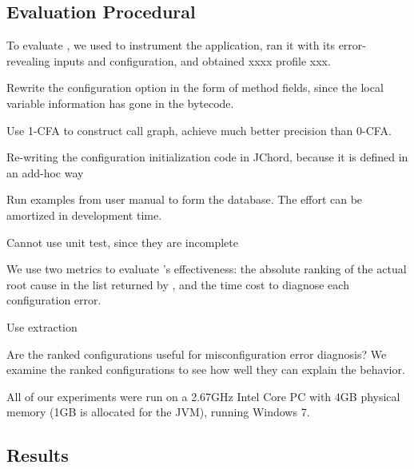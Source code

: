 \subsection{Evaluation Procedural}


To evaluate \ourtool, we used \ourtool to instrument
the application, ran it with its error-revealing
inputs and configuration, and obtained xxxx profile xxx. 

Rewrite the configuration option in the form of method fields, since
the local variable information has gone in the bytecode.

Use 1-CFA to construct call graph, achieve much better precision
than 0-CFA. 

Re-writing the configuration initialization code in JChord, because
it is defined in an add-hoc way

Run examples from user manual to form the database. The effort
can be amortized in development time.

Cannot use unit test, since they are incomplete

We use two metrics to evaluate \ourtool's effectiveness: the absolute ranking of the
actual root cause in the list returned by \ourtool, and the
time cost to diagnose each configuration error.

Use extraction~\cite{Rabkin:2011:SEP}

Are the ranked configurations useful for misconfiguration
error diagnosis?  We examine the ranked configurations to see how well they can explain the behavior.

All of our experiments were run on a
2.67GHz Intel Core PC with 4GB physical memory (1GB is allocated
for the JVM), running Windows 7.


\subsection{Results}


